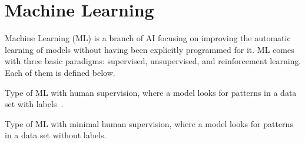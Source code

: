 
\section{Machine Learning}
\label{sec:background:ml}

Machine Learning (ML) is a branch of AI focusing on improving the automatic
learning of models without having been explicitly programmed for it. ML comes
with three basic paradigms: supervised, unsupervised, and reinforcement
learning. Each of them is defined below.

\begin{multicols}{2}
  \begin{definition}
    Type of ML with human supervision, where a model looks for patterns in a data
    set with labels~\citep{website:deepai:unsupervised:learning}.
    \label{def:supervised:learning}
  \end{definition}

  \begin{definition}
    Type of ML with minimal human supervision, where a model looks for patterns
    in a data set without labels.
    \label{def:unsupervised:learning}
  \end{definition}
\end{multicols}

